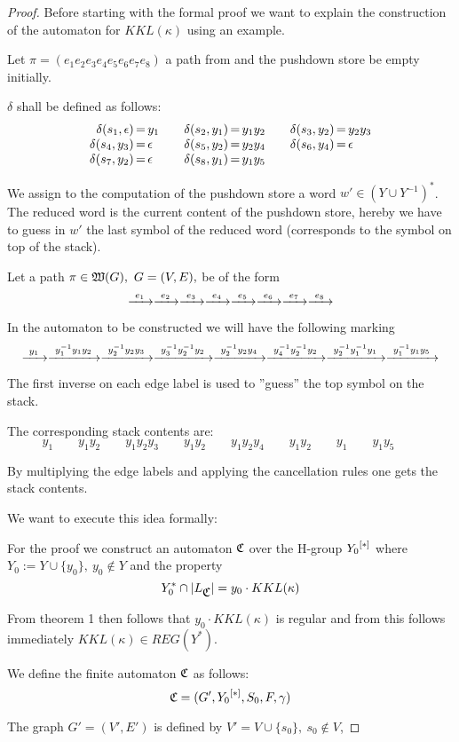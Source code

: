 \begin{proof}
Before starting with the formal proof we want to explain the construction of the
automaton for $KKL(\kappa)$ using an example.

Let $\pi = (e_1 e_2 e_3 e_4 e_5 e_6 e_7 e_8)$ a path from  and the
pushdown store be empty initially.

$\delta$ shall be defined as follows:
\[\begin{array}{r@{\,=\,}l@{\qquad}r@{\,=\,}l@{\qquad}r@{\,=\,}l}
\delta(s_1,\epsilon)&y_1 & \delta(s_2,y_1)&y_1y_2 & \delta(s_3,y_2)&y_2y_3 \\
\delta(s_4,y_3)&\epsilon & \delta(s_5,y_2)&y_2y_4 & \delta(s_6,y_4)&\epsilon \\
\delta(s_7,y_2)&\epsilon & \delta(s_8,y_1)&y_1y_5
\end{array}\]

We assign to the computation of the pushdown store a word $w' \in (Y\cup
Y^{-1})^*$. The reduced word is the current content of the pushdown store,
hereby we have to guess in $w'$ the last symbol of the reduced word
(corresponds to the symbol on top of the stack).

Let a path $\pi \in \pathcategory{G},\ G=(V,E),$ be of the form
\[ \xrightarrow{\ {e_1}\ } \xrightarrow{\ {e_2}\ } \xrightarrow{\ {e_3}\ } \xrightarrow{\ {e_4}\ } \xrightarrow{\ {e_5}\ } \xrightarrow{\ {e_6}\ } \xrightarrow{\ {e_7}\ }
\xrightarrow{\ {e_8}\ } \]

In the automaton to be constructed we will have the following marking
\[ \xrightarrow{\ {y_1}\ } \xrightarrow{\ {y_1^{-1} y_1 y_2}\ } \xrightarrow{\ {y_2^{-1} y_2 y_3}\ } \xrightarrow{\ {y_3^{-1}
y_2^{-1} y_2}\ } \xrightarrow{\ {y_2^{-1} y_2 y_4}\ } \xrightarrow{\ {y_4^{-1} y_2^{-1} y_2}\ }
\xrightarrow{\ {y_2^{-1} y_1^{-1} y_1}\ } \xrightarrow{\ {y_1^{-1} y_1 y_5}\ }
\]

The first inverse on each edge label is used to ''guess'' the top symbol on
the stack.

The corresponding stack contents are:
\[ y_1 \qquad y_1 y_2 \qquad y_1 y_2 y_3 \qquad y_1 y_2 \qquad y_1 y_2 y_4
\qquad y_1 y_2 \qquad y_1 \qquad y_1 y_5 \qquad \]

By multiplying the edge labels and applying the cancellation rules one gets the
stack contents.

We want to execute this idea formally:

For the proof we construct an automaton $\mbox{$\mathfrak{C}$}$ over the H-group $\mbox{${Y_0}^{[*]}$}$
where $Y_0 := Y \cup \{y_0\},\ y_0 \notin Y$ and the property
\[ Y_0^* \cap |L_{\mbox{$\mathfrak{C}$}}| = y_0 \cdot KKL(\kappa) \]

From theorem 1 then follows that $y_0 \cdot KKL(\kappa)$ is regular and from
this follows immediately $KKL(\kappa) \in REG(Y^*)$.


We define the finite automaton $\mbox{$\mathfrak{C}$}$ as follows:
\[ \mbox{$\mathfrak{C}$} = (G', \mbox{${Y_0}^{[*]}$}, S_0, F, \gamma) \]

The graph $G'=(V',E')$ is defined by $V' = V \cup \{s_0\},\ s_0 \notin V$,
\end{proof}
